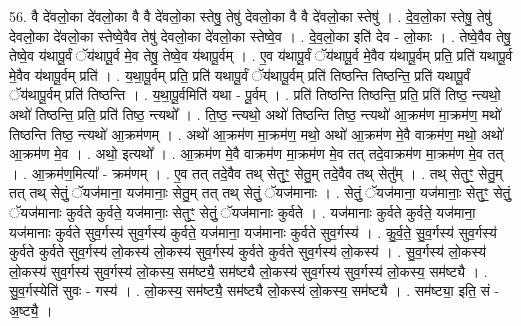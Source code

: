 \documentclass[17pt]{extarticle}
\begin{document}
56. वै दे॑वलो॒का दे॑वलो॒का वै वै दे॑वलो॒का स्तेषु॒ तेषु॑ देवलो॒का वै वै दे॑वलो॒का स्तेषु॑ । . दे॒व॒लो॒का स्तेषु॒ तेषु॑ देवलो॒का दे॑वलो॒का स्तेष्वे॒वैव तेषु॑ देवलो॒का दे॑वलो॒का स्तेष्वे॒व । . दे॒व॒लो॒का इति॑ देव - लो॒काः । . तेष्वे॒वैव तेषु॒ तेष्वे॒व य॑थापू॒र्वं ॅय॑थापू॒र्व मे॒व तेषु॒ तेष्वे॒व य॑थापू॒र्वम् । . ए॒व य॑थापू॒र्वं ॅय॑थापू॒र्व मे॒वैव य॑थापू॒र्वम् प्रति॒ प्रति॑ यथापू॒र्व मे॒वैव य॑थापू॒र्वम् प्रति॑ । . य॒था॒पू॒र्वम् प्रति॒ प्रति॑ यथापू॒र्वं ॅय॑थापू॒र्वम् प्रति॑ तिष्ठन्ति तिष्ठन्ति॒ प्रति॑ यथापू॒र्वं ॅय॑थापू॒र्वम् प्रति॑ तिष्ठन्ति । . य॒था॒पू॒र्वमिति॑ यथा - पू॒र्वम् । . प्रति॑ तिष्ठन्ति तिष्ठन्ति॒ प्रति॒ प्रति॑ तिष्ठ॒ न्त्यथो॒ अथो॑ तिष्ठन्ति॒ प्रति॒ प्रति॑ तिष्ठ॒ न्त्यथो᳚ । . ति॒ष्ठ॒ न्त्यथो॒ अथो॑ तिष्ठन्ति तिष्ठ॒ न्त्यथो॑ आ॒क्रम॑ण मा॒क्रम॑ण॒ मथो॑ तिष्ठन्ति तिष्ठ॒ न्त्यथो॑ आ॒क्रम॑णम् । . अथो॑ आ॒क्रम॑ण मा॒क्रम॑ण॒ मथो॒ अथो॑ आ॒क्रम॑ण मे॒वै वाक्रम॑ण॒ मथो॒ अथो॑ आ॒क्रम॑ण मे॒व । . अथो॒ इत्यथो᳚ । . आ॒क्रम॑ण मे॒वै वाक्रम॑ण मा॒क्रम॑ण मे॒व तत् तदे॒वाक्रम॑ण मा॒क्रम॑ण मे॒व तत् । . आ॒क्रम॑ण॒मित्या᳚ - क्रम॑णम् । . ए॒व तत् तदे॒वैव तथ् सेतुꣳ॒॒ सेतु॒म् तदे॒वैव तथ् सेतु᳚म् । . तथ् सेतुꣳ॒॒ सेतु॒म् तत् तथ् सेतुं॒ ॅयज॑माना॒ यज॑मानाः॒ सेतु॒म् तत् तथ् सेतुं॒ ॅयज॑मानाः । . सेतुं॒ ॅयज॑माना॒ यज॑मानाः॒ सेतुꣳ॒॒ सेतुं॒ ॅयज॑मानाः कुर्वते कुर्वते॒ यज॑मानाः॒ सेतुꣳ॒॒ सेतुं॒ ॅयज॑मानाः कुर्वते । . यज॑मानाः कुर्वते कुर्वते॒ यज॑माना॒ यज॑मानाः कुर्वते सुव॒र्गस्य॑ सुव॒र्गस्य॑ कुर्वते॒ यज॑माना॒ यज॑मानाः कुर्वते सुव॒र्गस्य॑ । . कु॒र्व॒ते॒ सु॒व॒र्गस्य॑ सुव॒र्गस्य॑ कुर्वते कुर्वते सुव॒र्गस्य॑ लो॒कस्य॑ लो॒कस्य॑ सुव॒र्गस्य॑ कुर्वते कुर्वते सुव॒र्गस्य॑ लो॒कस्य॑ । . सु॒व॒र्गस्य॑ लो॒कस्य॑ लो॒कस्य॑ सुव॒र्गस्य॑ सुव॒र्गस्य॑ लो॒कस्य॒ सम॑ष्ट्यै॒ सम॑ष्ट्यै लो॒कस्य॑ सुव॒र्गस्य॑ सुव॒र्गस्य॑ लो॒कस्य॒ सम॑ष्ट्यै । . सु॒व॒र्गस्येति॑ सुवः - गस्य॑ । . लो॒कस्य॒ सम॑ष्ट्यै॒ सम॑ष्ट्यै लो॒कस्य॑ लो॒कस्य॒ सम॑ष्ट्यै । . सम॑ष्ट्या॒ इति॒ सं - अ॒ष्ट्यै॒ । \newline
\pagebreak
{}
\end{document}
